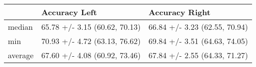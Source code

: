 \begin{tabular}{lll}
\toprule
{} &                  Accuracy Left &                 Accuracy Right \\
\midrule
median  &  65.78 +/- 3.15 (60.62, 70.13) &  66.84 +/- 3.23 (62.55, 70.94) \\
min     &  70.93 +/- 4.72 (63.13, 76.62) &  69.84 +/- 3.51 (64.63, 74.05) \\
average &  67.60 +/- 4.08 (60.92, 73.46) &  67.84 +/- 2.55 (64.33, 71.27) \\
\bottomrule
\end{tabular}

